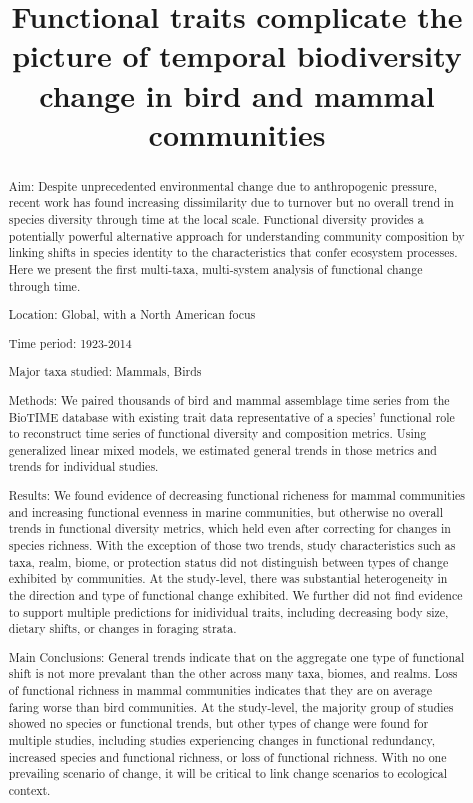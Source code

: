 \documentclass{article}
\title{Functional traits complicate the picture of temporal biodiversity
change in bird and mammal communities}
\author{
  }
\begin{document}
\maketitle


\begin{abstract}
Aim: Despite unprecedented environmental change due to anthropogenic
pressure, recent work has found increasing dissimilarity due to turnover
but no overall trend in species diversity through time at the local
scale. Functional diversity provides a potentially powerful alternative
approach for understanding community composition by linking shifts in
species identity to the characteristics that confer ecosystem processes.
Here we present the first multi-taxa, multi-system analysis of
functional change through time.

Location: Global, with a North American focus

Time period: 1923-2014

Major taxa studied: Mammals, Birds

Methods: We paired thousands of bird and mammal assemblage time series
from the BioTIME database with existing trait data representative of a
species' functional role to reconstruct time series of functional
diversity and composition metrics. Using generalized linear mixed
models, we estimated general trends in those metrics and trends for
individual studies.

Results: We found evidence of decreasing functional richeness for mammal
communities and increasing functional evenness in marine communities,
but otherwise no overall trends in functional diversity metrics, which
held even after correcting for changes in species richness. With the
exception of those two trends, study characteristics such as taxa,
realm, biome, or protection status did not distinguish between types of
change exhibited by communities. At the study-level, there was
substantial heterogeneity in the direction and type of functional change
exhibited. We further did not find evidence to support multiple
predictions for inidividual traits, including decreasing body size,
dietary shifts, or changes in foraging strata.

Main Conclusions: General trends indicate that on the aggregate one type
of functional shift is not more prevalant than the other across many
taxa, biomes, and realms. Loss of functional richness in mammal
communities indicates that they are on average faring worse than bird
communities. At the study-level, the majority group of studies showed no
species or functional trends, but other types of change were found for
multiple studies, including studies experiencing changes in functional
redundancy, increased species and functional richness, or loss of
functional richness. With no one prevailing scenario of change, it will
be critical to link change scenarios to ecological context.
\end{abstract}
\end{document}

